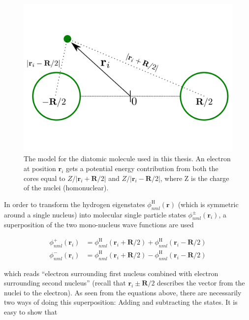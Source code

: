 \begin{figure}
 \begin{center}
  \includegraphics[scale=0.3]{../Graphics/Molecules.pdf}
  \caption{The model for the diatomic molecule used in this thesis. An electron at position $\mathbf{r}_i$ gets a potential energy contribution from both the cores equal to $Z/|\mathbf{r}_i + \mathbf{R}/2|$ and  $Z/|\mathbf{r}_i - \mathbf{R}/2|$, where Z is the charge of the nuclei (homonuclear).}
  \label{fig:dimolecules}
 \end{center}
\end{figure}


In order to transform the hydrogen eigenstates $\phi_{nml}^\mathrm{H}(\mathbf{r})$ (which is symmetric around a single nucleus) into molecular single particle states $\phi_{nml}^\pm (\mathbf{r}_i)$, a superposition of the two mono-nucleus wave functions are used

\begin{align}
 \phi_{nml}^+ (\mathbf{r}_i) &= \phi_{nml}^\mathrm{H}(\mathbf{r}_i + \mathbf{R}/2) + \phi_{nml}^\mathrm{H}(\mathbf{r}_i - \mathbf{R}/2) \\
 \phi_{nml}^- (\mathbf{r}_i) &= \phi_{nml}^\mathrm{H}(\mathbf{r}_i + \mathbf{R}/2) - \phi_{nml}^\mathrm{H}(\mathbf{r}_i - \mathbf{R}/2)
\end{align}

which reads ``electron surrounding first nucleus combined with electron surrounding second nucleus'' (recall that $\mathbf{r}_i \pm \mathbf{R}/2$ describes the vector from the nuclei to the electron). As seen from the equations above, there are necessarily two ways of doing this superposition: Adding and subtracting the states. It is easy to show that 

